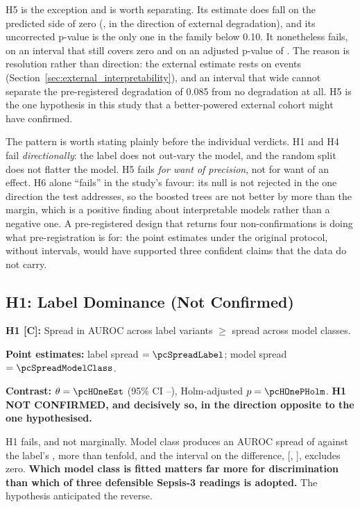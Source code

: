 H5 is the exception and is worth separating. Its estimate does fall on the
predicted side of zero (\pcHFiveEst, in the direction of external degradation),
and its uncorrected p-value is the only one in the family below 0.10. It
nonetheless fails, on an interval that still covers zero and on an adjusted
p-value of \pcHFivePHolm. The reason is resolution rather than direction: the
external estimate rests on \pcExtNEventsB{} events
(Section~\ref{sec:external_interpretability}), and an interval that wide cannot
separate the pre-registered degradation of 0.085 from no degradation at all.
H5 is the one hypothesis in this study that a better-powered external cohort
might have confirmed.

The pattern is worth stating plainly before the individual verdicts. H1 and H4
fail \emph{directionally}: the label does not out-vary the model, and the random
split does not flatter the model. H5 fails \emph{for want of precision}, not for
want of an effect. H6 alone ``fails'' in the study's favour: its null is not
rejected in the one direction the test addresses, so the boosted trees are not
better by more than the margin, which is a positive finding about interpretable
models rather than a negative one. A pre-registered design that returns four
non-confirmations is doing what pre-registration is for: the point estimates
under the original protocol, without intervals, would have supported three
confident claims that the data do not carry.

\subsection{H1: Label Dominance (Not Confirmed)}

\begin{mdframed}[backgroundcolor=ATUOrange!20, linecolor=ATUOrange]
    \textbf{H1 [C]:} Spread in AUROC across label variants $\geq$ spread across
    model classes.

    \textbf{Point estimates:} label spread $= \pcSpreadLabel$;
    model spread $= \pcSpreadModelClass$.

    \textbf{Contrast:} $\theta = \pcHOneEst$ (95\% CI
    \pcHOneCiLo--\pcHOneCiHi), Holm-adjusted $p = \pcHOnePHolm$.
    \textbf{H1 NOT CONFIRMED, and decisively so, in the direction opposite
    to the one hypothesised.}
\end{mdframed}

H1 fails, and not marginally. Model class produces an AUROC spread of
\pcSpreadModelClass{} against the label's \pcSpreadLabel{}, more than
tenfold, and the interval on the difference,
[\pcHOneCiLo, \pcHOneCiHi], excludes zero. \textbf{Which model class is fitted
matters far more for discrimination than which of three defensible Sepsis-3
readings is adopted.} The hypothesis anticipated the reverse.

